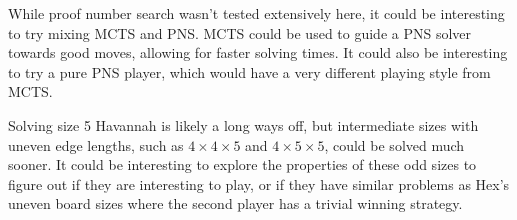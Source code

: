 While proof number search wasn't tested extensively here, it could be interesting to try mixing MCTS and PNS. MCTS could be used to guide a PNS solver towards good moves, allowing for faster solving times. It could also be interesting to try a pure PNS player, which would have a very different playing style from MCTS.

Solving size 5 Havannah is likely a long ways off, but intermediate sizes with uneven edge lengths, such as $4 \times 4 \times 5$ and $4 \times 5 \times 5$, could be solved much sooner. It could be interesting to explore the properties of these odd sizes to figure out if they are interesting to play, or if they have similar problems as Hex's uneven board sizes where the second player has a trivial winning strategy.


